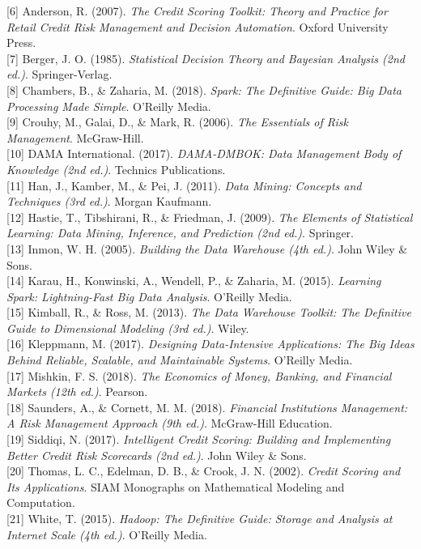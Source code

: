 \documentclass[
  13pt,
  a4paper,
]{report}
\begin{document}
{[}6{]} Anderson, R. (2007). \emph{The Credit Scoring Toolkit: Theory
and Practice for Retail Credit Risk Management and Decision Automation}.
Oxford University Press.\\
{[}7{]} Berger, J. O. (1985). \emph{Statistical Decision Theory and
Bayesian Analysis (2nd ed.)}. Springer-Verlag.\\
{[}8{]} Chambers, B., \& Zaharia, M. (2018). \emph{Spark: The Definitive
Guide: Big Data Processing Made Simple}. O'Reilly Media.\\
{[}9{]} Crouhy, M., Galai, D., \& Mark, R. (2006). \emph{The Essentials
of Risk Management}. McGraw-Hill.\\
{[}10{]} DAMA International. (2017). \emph{DAMA-DMBOK: Data Management
Body of Knowledge (2nd ed.)}. Technics Publications.\\
{[}11{]} Han, J., Kamber, M., \& Pei, J. (2011). \emph{Data Mining:
Concepts and Techniques (3rd ed.)}. Morgan Kaufmann.\\
{[}12{]} Hastie, T., Tibshirani, R., \& Friedman, J. (2009). \emph{The
Elements of Statistical Learning: Data Mining, Inference, and Prediction
(2nd ed.)}. Springer.\\
{[}13{]} Inmon, W. H. (2005). \emph{Building the Data Warehouse (4th
ed.)}. John Wiley \& Sons.\\
{[}14{]} Karau, H., Konwinski, A., Wendell, P., \& Zaharia, M. (2015).
\emph{Learning Spark: Lightning-Fast Big Data Analysis}. O'Reilly
Media.\\
{[}15{]} Kimball, R., \& Ross, M. (2013). \emph{The Data Warehouse
Toolkit: The Definitive Guide to Dimensional Modeling (3rd ed.)}.
Wiley.\\
{[}16{]} Kleppmann, M. (2017). \emph{Designing Data-Intensive
Applications: The Big Ideas Behind Reliable, Scalable, and Maintainable
Systems}. O'Reilly Media.\\
{[}17{]} Mishkin, F. S. (2018). \emph{The Economics of Money, Banking,
and Financial Markets (12th ed.)}. Pearson.\\
{[}18{]} Saunders, A., \& Cornett, M. M. (2018). \emph{Financial
Institutions Management: A Risk Management Approach (9th ed.)}.
McGraw-Hill Education.\\
{[}19{]} Siddiqi, N. (2017). \emph{Intelligent Credit Scoring: Building
and Implementing Better Credit Risk Scorecards (2nd ed.)}. John Wiley \&
Sons.\\
{[}20{]} Thomas, L. C., Edelman, D. B., \& Crook, J. N. (2002).
\emph{Credit Scoring and Its Applications}. SIAM Monographs on
Mathematical Modeling and Computation.\\
{[}21{]} White, T. (2015). \emph{Hadoop: The Definitive Guide: Storage
and Analysis at Internet Scale (4th ed.)}. O'Reilly Media.
\end{document}
